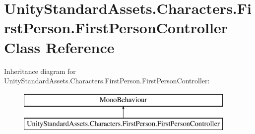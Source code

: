 \hypertarget{class_unity_standard_assets_1_1_characters_1_1_first_person_1_1_first_person_controller}{}\section{Unity\+Standard\+Assets.\+Characters.\+First\+Person.\+First\+Person\+Controller Class Reference}
\label{class_unity_standard_assets_1_1_characters_1_1_first_person_1_1_first_person_controller}
Inheritance diagram for Unity\+Standard\+Assets.\+Characters.\+First\+Person.\+First\+Person\+Controller\+:\begin{figure}[H]
\begin{center}
\leavevmode
\includegraphics[height=2.000000cm]{class_unity_standard_assets_1_1_characters_1_1_first_person_1_1_first_person_controller}
\end{center}
\end{figure}
